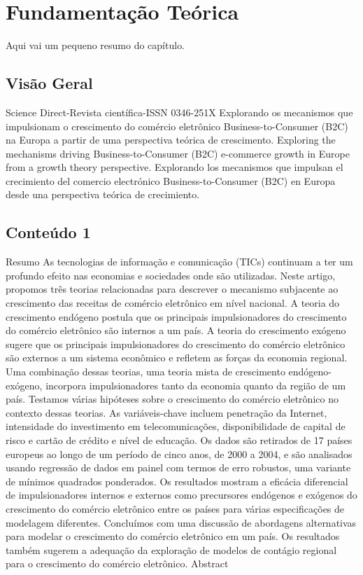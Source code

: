 \chapter{Fundamentação Teórica}
\label{ch:identificador}
	\begin{resumocapitulo}
		Aqui vai um pequeno resumo do capítulo.
	\end{resumocapitulo}

	\section{Visão Geral}
		Science Direct-Revista científica-ISSN 0346-251X
  Explorando os mecanismos  que impulsionam o crescimento do comércio eletrônico Business-to-Consumer (B2C) na Europa a partir de uma perspectiva teórica de crescimento.
  Exploring the mechanisms driving Business-to-Consumer (B2C) e-commerce growth in Europe from a growth theory perspective.
Explorando los mecanismos que impulsan el crecimiento del comercio electrónico Business-to-Consumer (B2C) en Europa desde una perspectiva teórica de crecimiento.
  

	\section{Conteúdo 1}
	\label{sec:identificao}
        Resumo
        As tecnologias de informação e comunicação (TICs) continuam a ter um profundo efeito nas economias e sociedades onde são utilizadas. Neste artigo, propomos três teorias relacionadas para descrever o mecanismo subjacente ao crescimento das receitas de comércio eletrônico em nível nacional. A teoria do crescimento endógeno postula que os principais impulsionadores do crescimento do comércio eletrônico são internos a um país. A teoria do crescimento exógeno sugere que os principais impulsionadores do crescimento do comércio eletrônico são externos a um sistema econômico e refletem as forças da economia regional. Uma combinação dessas teorias, uma teoria mista de crescimento endógeno-exógeno, incorpora impulsionadores tanto da economia quanto da região de um país. Testamos várias hipóteses sobre o crescimento do comércio eletrônico no contexto dessas teorias. As variáveis-chave incluem penetração da Internet, intensidade do investimento em telecomunicações, disponibilidade de capital de risco e cartão de crédito e nível de educação. Os dados são retirados de 17 países europeus ao longo de um período de cinco anos, de 2000 a 2004, e são analisados usando regressão de dados em painel com termos de erro robustos, uma variante de mínimos quadrados ponderados. Os resultados mostram a eficácia diferencial de impulsionadores internos e externos como precursores endógenos e exógenos do crescimento do comércio eletrônico entre os países para várias especificações de modelagem diferentes. Concluímos com uma discussão de abordagens alternativas para modelar o crescimento do comércio eletrônico em um país. Os resultados também sugerem a adequação da exploração de modelos de contágio regional para o crescimento do comércio eletrônico.
        Abstract

